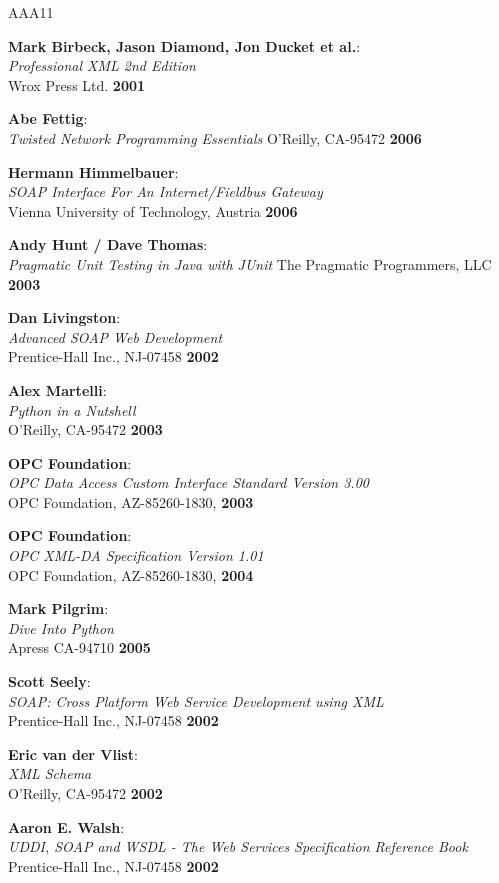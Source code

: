 %
%
\begin {thebibliography}{AAA11}

 {\bf Mark Birbeck, Jason Diamond, Jon Ducket et al.}:\\
{\it Professional XML 2nd Edition}\\
Wrox Press Ltd. {\bf 2001}

 {\bf Abe Fettig}:\\
{\it Twisted Network Programming Essentials}
O'Reilly, CA-95472 {\bf 2006}

 {\bf Hermann Himmelbauer}:\\
{\it SOAP Interface For An Internet/Fieldbus Gateway}
\\ Vienna University of Technology, Austria
{\bf 2006}

 {\bf Andy Hunt / Dave Thomas}:\\
{\it Pragmatic Unit Testing in Java with JUnit}
The Pragmatic Programmers, LLC {\bf 2003}

 {\bf Dan Livingston}:\\
{\it Advanced SOAP Web Development}\\
Prentice-Hall Inc., NJ-07458 {\bf 2002}

 {\bf Alex Martelli}:\\
{\it Python in a Nutshell}\\
O'Reilly, CA-95472 {\bf 2003}

 {\bf OPC Foundation}:\\
{\it OPC Data Access Custom Interface Standard Version 3.00}\\
OPC Foundation, AZ-85260-1830, {\bf 2003}

 {\bf OPC Foundation}:\\
{\it OPC XML-DA Specification Version 1.01}\\ OPC Foundation,
AZ-85260-1830, {\bf 2004}

 {\bf Mark Pilgrim}:\\
{\it Dive Into Python}\\
Apress CA-94710 {\bf 2005}

 {\bf Scott Seely}:\\
{\it SOAP: Cross Platform Web Service Development using XML}\\
Prentice-Hall Inc., NJ-07458 {\bf 2002}

 {\bf Eric van der Vlist}:\\
{\it XML Schema}\\
O'Reilly, CA-95472 {\bf 2002}

 {\bf Aaron E. Walsh}:\\
{\it UDDI, SOAP and WSDL - The Web Services Specification
Reference Book}\\
Prentice-Hall Inc., NJ-07458 {\bf 2002}

\end{thebibliography}
